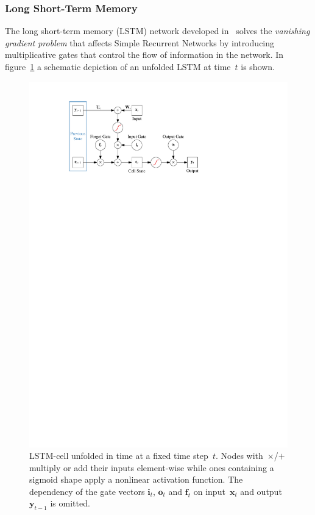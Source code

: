 \subsubsection{Long Short-Term Memory}
\label{sec:lstm}
The long short-term memory (LSTM) network developed in~\cite{lstm} solves the
\emph{vanishing gradient problem} that affects Simple Recurrent Networks by
introducing multiplicative gates that control the flow of information in the
network. In figure~\ref{fig:schematic_lstm} a schematic depiction of an unfolded
LSTM at time~$t$ is shown.
\begin{figure}[htb]
  \centering
  \includegraphics{./figures/theory/LSTM.pdf}
  \caption{LSTM-cell unfolded in time at a fixed time step~$t$. Nodes
    with~$\times$/$+$ multiply or add their inputs element-wise while ones
    containing a sigmoid shape apply a nonlinear activation function. The
    dependency of the gate vectors $\mathbf{i}_t$, $\mathbf{o}_t$ and
    $\mathbf{f}_t$ on input~$\mathbf{x}_t$ and output~$\mathbf{y}_{t-1}$ is
    omitted.}
  \label{fig:schematic_lstm}
\end{figure}
